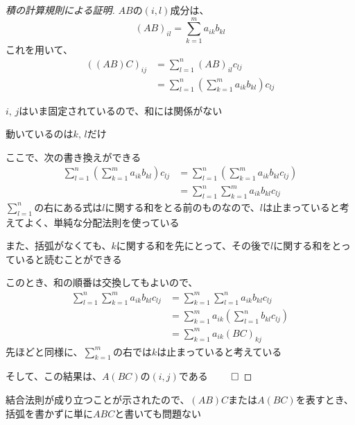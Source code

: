 \documentclass[../../../topic_linear-algebra]{subfiles}
\begin{document}
\begin{proof}[積の計算規則による証明]
  $AB$の$(i,l)$成分は、
  \begin{equation*}
    (AB)_{il} = \sum_{k=1}^m a_{ik} b_{kl}
  \end{equation*}
  これを用いて、
  \begin{align*}
    ((AB)C)_{ij} & = \sum_{l=1}^n (AB)_{il} c_{lj}                                 \\
                 & = \sum_{l=1}^n \left( \sum_{k=1}^m a_{ik} b_{kl} \right) c_{lj}
  \end{align*}

  $i,\,j$はいま固定されているので、和には関係がない

  動いているのは$k,\,l$だけ

  \br

  ここで、次の書き換えができる
  \begin{align*}
    \sum_{l=1}^n \left( \sum_{k=1}^m a_{ik} b_{kl} \right) c_{lj} & = \sum_{l=1}^n \left(\sum_{k=1}^m a_{ik} b_{kl} c_{lj} \right) \\
                                                                  & = \sum_{l=1}^n \sum_{k=1}^m a_{ik} b_{kl} c_{lj}
  \end{align*}
  $\displaystyle\sum_{l=1}^n$の右にある式は$l$に関する和をとる前のものなので、$l$は止まっていると考えてよく、単純な分配法則を使っている

  また、括弧がなくても、$k$に関する和を先にとって、その後で$l$に関する和をとっていると読むことができる

  \br

  このとき、和の順番は交換してもよいので、
  \begin{align*}
    \sum_{l=1}^n \sum_{k=1}^m a_{ik} b_{kl} c_{lj} & = \sum_{k=1}^m \sum_{l=1}^n a_{ik} b_{kl} c_{lj}                \\
                                                   & = \sum_{k=1}^m a_{ik} \left( \sum_{l=1}^n b_{kl} c_{lj} \right) \\
                                                   & = \sum_{k=1}^m a_{ik} (BC)_{kj}
  \end{align*}
  先ほどと同様に、$\displaystyle\sum_{k=1}^m$の右では$k$は止まっていると考えている

  そして、この結果は、$A(BC)$の$(i, j)$である $\qed$
\end{proof}

結合法則が成り立つことが示されたので、$(AB)C$または$A(BC)$を表すとき、括弧を書かずに単に$ABC$と書いても問題ない
\end{document}
